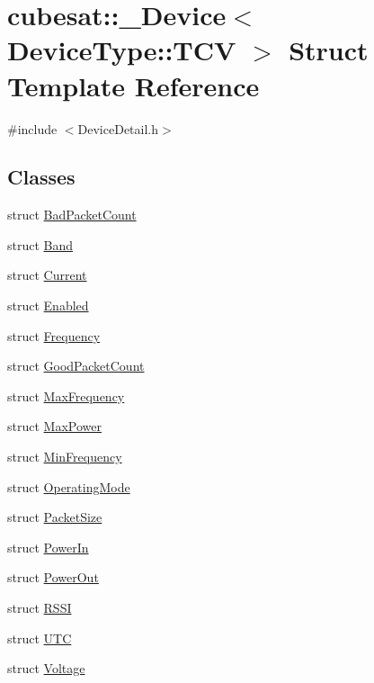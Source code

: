 \hypertarget{structcubesat_1_1__Device_3_01DeviceType_1_1TCV_01_4}{}\section{cubesat\+:\+:\+\_\+\+Device$<$ Device\+Type\+:\+:T\+CV $>$ Struct Template Reference}
\label{structcubesat_1_1__Device_3_01DeviceType_1_1TCV_01_4}


{\ttfamily \#include $<$Device\+Detail.\+h$>$}

\subsection*{Classes}
\begin{DoxyCompactItemize}
\item 
struct \hyperlink{structcubesat_1_1__Device_3_01DeviceType_1_1TCV_01_4_1_1BadPacketCount}{Bad\+Packet\+Count}
\item 
struct \hyperlink{structcubesat_1_1__Device_3_01DeviceType_1_1TCV_01_4_1_1Band}{Band}
\item 
struct \hyperlink{structcubesat_1_1__Device_3_01DeviceType_1_1TCV_01_4_1_1Current}{Current}
\item 
struct \hyperlink{structcubesat_1_1__Device_3_01DeviceType_1_1TCV_01_4_1_1Enabled}{Enabled}
\item 
struct \hyperlink{structcubesat_1_1__Device_3_01DeviceType_1_1TCV_01_4_1_1Frequency}{Frequency}
\item 
struct \hyperlink{structcubesat_1_1__Device_3_01DeviceType_1_1TCV_01_4_1_1GoodPacketCount}{Good\+Packet\+Count}
\item 
struct \hyperlink{structcubesat_1_1__Device_3_01DeviceType_1_1TCV_01_4_1_1MaxFrequency}{Max\+Frequency}
\item 
struct \hyperlink{structcubesat_1_1__Device_3_01DeviceType_1_1TCV_01_4_1_1MaxPower}{Max\+Power}
\item 
struct \hyperlink{structcubesat_1_1__Device_3_01DeviceType_1_1TCV_01_4_1_1MinFrequency}{Min\+Frequency}
\item 
struct \hyperlink{structcubesat_1_1__Device_3_01DeviceType_1_1TCV_01_4_1_1OperatingMode}{Operating\+Mode}
\item 
struct \hyperlink{structcubesat_1_1__Device_3_01DeviceType_1_1TCV_01_4_1_1PacketSize}{Packet\+Size}
\item 
struct \hyperlink{structcubesat_1_1__Device_3_01DeviceType_1_1TCV_01_4_1_1PowerIn}{Power\+In}
\item 
struct \hyperlink{structcubesat_1_1__Device_3_01DeviceType_1_1TCV_01_4_1_1PowerOut}{Power\+Out}
\item 
struct \hyperlink{structcubesat_1_1__Device_3_01DeviceType_1_1TCV_01_4_1_1RSSI}{R\+S\+SI}
\item 
struct \hyperlink{structcubesat_1_1__Device_3_01DeviceType_1_1TCV_01_4_1_1UTC}{U\+TC}
\item 
struct \hyperlink{structcubesat_1_1__Device_3_01DeviceType_1_1TCV_01_4_1_1Voltage}{Voltage}
\end{DoxyCompactItemize}
